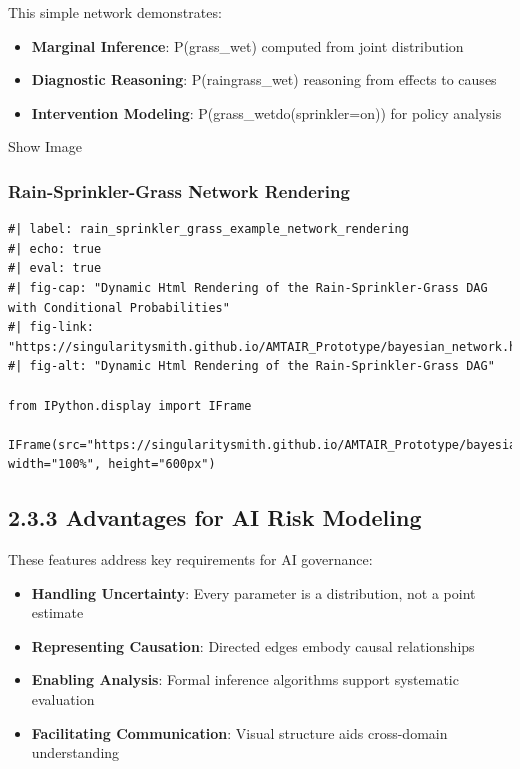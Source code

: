 \documentclass[
  11pt,
  letterpaper,
]{book}
\providecommand{\tightlist}{%
  \setlength{\itemsep}{0pt}\setlength{\parskip}{0pt}}
\begin{document}
This simple network demonstrates:

\begin{itemize}
\tightlist
\item
  \textbf{Marginal Inference}: P(grass\_wet) computed from joint
  distribution
\item
  \textbf{Diagnostic Reasoning}: P(rain\textbar grass\_wet) reasoning
  from effects to causes
\item
  \textbf{Intervention Modeling}: P(grass\_wet\textbar do(sprinkler=on))
  for policy analysis
\end{itemize}

Show Image

\subsubsection{Rain-Sprinkler-Grass Network
Rendering}\label{rain-sprinkler-grass-network-rendering}

\begin{verbatim}
#| label: rain_sprinkler_grass_example_network_rendering
#| echo: true
#| eval: true
#| fig-cap: "Dynamic Html Rendering of the Rain-Sprinkler-Grass DAG with Conditional Probabilities"
#| fig-link: "https://singularitysmith.github.io/AMTAIR_Prototype/bayesian_network.html"
#| fig-alt: "Dynamic Html Rendering of the Rain-Sprinkler-Grass DAG"

from IPython.display import IFrame

IFrame(src="https://singularitysmith.github.io/AMTAIR_Prototype/bayesian_network.html", width="100%", height="600px")
\end{verbatim}

\subsection{2.3.3 Advantages for AI Risk
Modeling}\label{advantages-for-ai-risk-modeling}

These features address key requirements for AI governance:

\begin{itemize}
\tightlist
\item
  \textbf{Handling Uncertainty}: Every parameter is a distribution, not
  a point estimate
\item
  \textbf{Representing Causation}: Directed edges embody causal
  relationships
\item
  \textbf{Enabling Analysis}: Formal inference algorithms support
  systematic evaluation
\item
  \textbf{Facilitating Communication}: Visual structure aids
  cross-domain understanding
\end{itemize}
\end{document}
